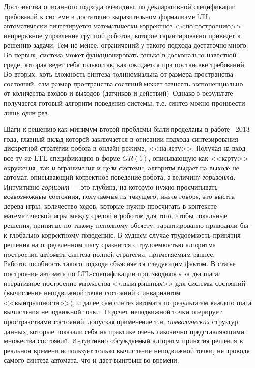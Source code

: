 \documentclass[a4, 14pt]{article}
\begin{document}
Достоинства описанного подхода очевидны: по декларативной спецификации требований 
к системе в достаточно выразительном формализме LTL автоматически синтезируется 
математически корректное <<по построению>> непрерывное управление группой роботов, 
которое гарантированно приведет к решению задачи. Тем не менее, ограничений у 
такого подхода достаточно много. Во-первых, система может функционировать только 
в досконально известной среде, которая ведет себя только так, как ожидается при 
постановке требований. Во-вторых, хоть сложность синтеза полиномиальна от размера 
пространства состояний, сам размер пространства состяний может зависеть экспоненциально
от количества входов и выходов (датчиков и действий). Однако в результате получается 
готовый алгоритм поведения системы, т.е. синтез можно произвести лишь один раз.

Шаги к решению как минимум второй проблемы были проделаны в работе~\cite{livingston2013just} 
2013 года, главный вклад которой заключается в описании подхода синтезирования 
дискретной стратегии робота в онлайн-режиме, <<на лету>>. Получая на вход все 
ту же LTL-спецификацию в форме $GR(1)$, описывающую как <<карту>> окружения, 
так и ограничения и цели системы, алгоритм выдает на выходе не автомат, 
описывающий корректное поведение робота, а величину \textit{горизонта}. Интуитивно 
\textit{горизонт} --- это глубина, на которую нужно просчитывать всевозможные состояния, 
получаемые из текущего, иначе говоря, это высота дерева игры, количество ходов, 
которые нужно просчитать в контексте математической игры между средой и роботом 
для того, чтобы локальные решения, принятые по такому неполному обсчету, 
гарантированно приводили бы к глобально корректному поведению. В худшем случае 
трудоемкость принятия решения на определенном шагу сравнится с трудоемкостью 
алгоритма построения автомата синтеза полной стратегии, применяемым раннее. 
Работоспособность такого подхода объясняется следующим фактом. В статье~\cite{piterman2006synthesis}
построение автомата по LTL-спецификации производилось за два шага: итеративное 
построение множества <<выигрышных>> для системы состояний (вычисление 
неподвижной точки состояний с инвариантом <<выигрышности>>), и далее сам синтез 
автомата по результатам каждого шага вычисления неподвижной точки. Подсчет неподвижной
точки оперирует пространствами состояний, допуская применение т.н. 
\textit{символических} структур данных, которые показали себя на практике 
очень лаконично представляющими множества состояний. Интуитивно обсуждаемый 
алгоритм принятия решения в реальном времени использует только вычисление 
неподвижной точки, не проводя самого синтеза автомата, что и дает выигрыш 
во времени.
\end{document}
